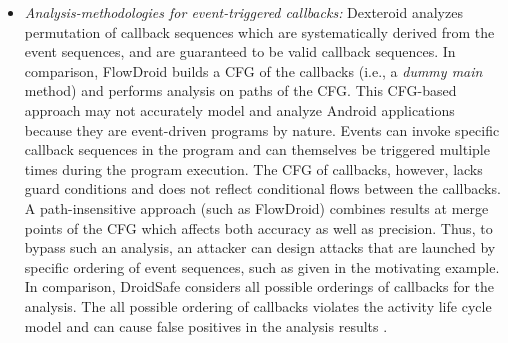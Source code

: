 \documentclass[10pt]{elsarticle}
\begin{document}
\begin{itemize}

\item \emph{Analysis-methodologies for event-triggered callbacks:} Dexteroid analyzes permutation of callback sequences which are systematically derived from the event sequences, and are guaranteed to be valid callback sequences. In comparison, FlowDroid builds a CFG of the callbacks (i.e., a \emph{dummy main} method) and performs analysis on paths of the CFG. This CFG-based approach may not accurately model and analyze Android applications because they are event-driven programs by nature. Events can invoke specific callback sequences in the program and can themselves be triggered multiple times during the program execution. The CFG of callbacks, however, lacks guard conditions and does not reflect conditional flows between the callbacks. A path-insensitive approach (such as FlowDroid) combines results at merge points of the CFG which affects both accuracy as well as precision. Thus, to bypass such an analysis, an attacker can design attacks that are launched by specific ordering of event sequences, such as given in the motivating example. In comparison, DroidSafe \cite{DroidSafe} considers all possible orderings of callbacks for the analysis. The all possible ordering of callbacks violates the activity life cycle model and can cause false positives in the analysis results \cite{DroidSafe}. 
 

\end{itemize}
\end{document}
